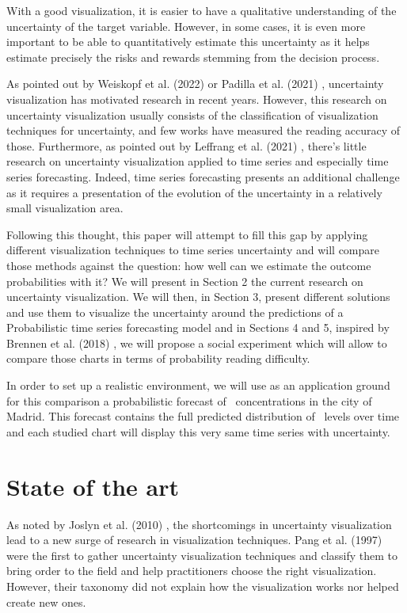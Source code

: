 \documentclass[a4paper,3p,sort&compress]{elsarticle}
\begin{document}
With a good visualization, it is easier to have a qualitative understanding of
the uncertainty of the target variable. However, in some cases, it is even more
important to be able to quantitatively estimate this uncertainty as it helps
estimate precisely the risks and rewards stemming from the decision process.

As pointed out by Weiskopf et al. (2022) \cite{weiskopf_uncertainty_2022} or Padilla et
al. (2021) \cite{padilla_uncertainty_2021}, uncertainty visualization has motivated
research in recent years. However, this research on uncertainty visualization
usually consists of the classification of visualization techniques for
uncertainty, and few works have measured the reading accuracy of those.
Furthermore, as pointed out by Leffrang et al. (2021) \cite{leffrang_should_2021},
there's little research on uncertainty visualization applied to time series and
especially time series forecasting. Indeed, time series forecasting presents an
additional challenge as it requires a presentation of the evolution of the
uncertainty in a relatively small visualization area.

Following this thought, this paper will attempt to fill this gap by applying
different visualization techniques to time series uncertainty and will compare
those methods against the question: how well can we estimate the outcome
probabilities with it? We will present in Section 2 the current research on
uncertainty visualization. We will then, in Section 3, present different
solutions and use them to visualize the uncertainty around the predictions of a
Probabilistic time series forecasting model and in Sections 4 and 5, inspired by
Brennen et al. (2018) \cite{brennen_instrument_2018}, we will propose a social
experiment which will allow to compare those charts in terms of probability
reading difficulty.

In order to set up a realistic environment, we will use as an application ground
for this comparison a probabilistic forecast of \no~concentrations in the city
of Madrid. This forecast contains the full predicted distribution of \no~levels
over time and each studied chart will display this very same time series with
uncertainty.

\section{State of the art}
\label{sec:results}

As noted by Joslyn et al. (2010) \cite{joslyn_communicating_2010}, the shortcomings in
uncertainty visualization lead to a new surge of research in visualization
techniques. Pang et al. (1997) \cite{pang_approaches_1997} were the first to gather
uncertainty visualization techniques and classify them to bring order to the
field and help practitioners choose the right visualization. However, their
taxonomy did not explain how the visualization works nor helped create new ones.
\end{document}

